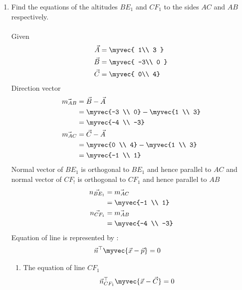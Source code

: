 \documentclass[11pt]{book}
\begin{document}
\begin{enumerate}[label=\thesection.\arabic*.,ref=\thesection.\theenumi]
\item Find the equations of the altitudes $BE_1$ and $CF_1$ to the sides $AC$ and $AB$ respectively. 
  \\    \\ \solution Given 
    \begin{align} 
 \vec{A} &= \myvec{ 1\\ 3 } \\ \vec{B} &= \myvec{ -3\\ 0 }
  \\\vec{C} &= \myvec{ 0\\ 4}
 \end{align}
 Direction vector 
 \begin{align}
     \vec{m_{AB}}&=\vec{B}-\vec{A} \\
           &=\myvec{-3 \\ 0} -\myvec{1 \\ 3}  \\
           &=\myvec{-4 \\ -3} \\
    \vec{ m_{AC}}&=\vec{C}-\vec{A} \\
     &=\myvec{0 \\ 4} -\myvec{1 \\ 3}  \\
     &=\myvec{-1 \\ 1} \\
 \end{align}
  Normal vector of $BE_1$ is orthogonal to $BE_1$  and hence parallel to $AC$ and normal vector of $CF_!$ is orthogonal to $CF_1$ and hence parallel to $AB$
  \begin{align}
      \vec{n_{BE_1}}&=\vec{m_{AC}}\\
      &=\myvec{-1 \\ 1}\\
      \vec{n_{CF_1}}&=\vec{m_{AB}}\\
      &=\myvec{-4 \\ -3}\\
  \end{align}
  Equation of line is represented by :
  \begin{align}
      \vec{n}^{\top}\myvec{\vec{x}-\vec{p}}&=0
  \end{align}
  \begin{enumerate}
      \item The equation of line $CF_1$
      \begin{align}
          \vec{n}^{\top}_{CF_1}\myvec{\vec{x}-\vec{C}}&=0 \\

\end{align}
\end{enumerate}
\end{enumerate}
\end{document}
